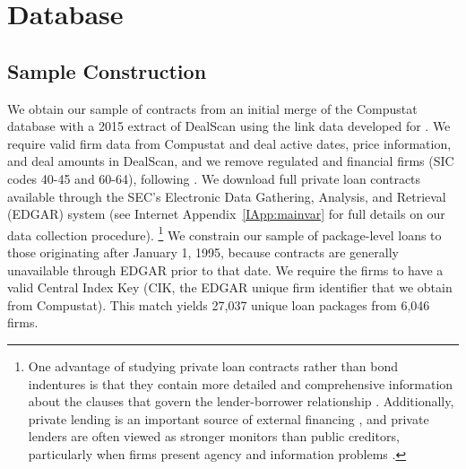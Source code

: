 \documentclass[a4paper,12pt]{article}
\begin{document}
\section{Database}
\label{section:database}

\subsection{Sample Construction}
We obtain our sample of contracts from an initial merge of the Compustat database with a 2015 extract of DealScan using the link data developed for \cite{Chava_2008}.
We require valid firm data from Compustat and deal active dates, price information, and deal amounts in DealScan, and we remove regulated and financial firms (SIC codes 40-45 and 60-64), following \cite{Ivashina_2009}.
We download full private loan contracts available through the SEC's Electronic Data Gathering, Analysis, and Retrieval (EDGAR) system (see Internet Appendix~\ref{IApp:mainvar} for full details on our data collection procedure).%
	\footnote{One advantage of studying private loan contracts rather than bond indentures is that they contain more detailed and comprehensive information about the clauses that govern the lender-borrower relationship \citep{Nini_2009}. Additionally, private lending is an important source of external financing \citep{Sufi_2007, Roberts_2015a}, and private lenders are often viewed as stronger monitors than public creditors, particularly when firms present agency and information problems \citep{Diamond_1984, Diamond_1991}.}
We constrain our sample of package-level loans to those originating after January 1, 1995, because contracts are generally unavailable through EDGAR prior to that date.
We require the firms to have a valid Central Index Key (CIK, the EDGAR unique firm identifier that we obtain from Compustat).
This match yields 27,037 unique loan packages from 6,046 firms.
\end{document}
